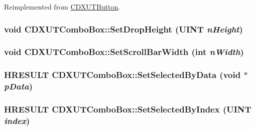 Reimplemented from \hyperlink{class_c_d_x_u_t_button_a75a837a8eca0777b51d3aac6de6d6144}{CDXUTButton}.\hypertarget{class_c_d_x_u_t_combo_box_a1ace87e91be7ab78d7367e99f1788952}{
\subsubsection[{SetDropHeight}]{\setlength{\rightskip}{0pt plus 5cm}void CDXUTComboBox::SetDropHeight (UINT {\em nHeight})}}
\label{class_c_d_x_u_t_combo_box_a1ace87e91be7ab78d7367e99f1788952}
\hypertarget{class_c_d_x_u_t_combo_box_a88c5c2c892f239357443fc6b3b37c40d}{
\subsubsection[{SetScrollBarWidth}]{\setlength{\rightskip}{0pt plus 5cm}void CDXUTComboBox::SetScrollBarWidth ({\bf int} {\em nWidth})}}
\label{class_c_d_x_u_t_combo_box_a88c5c2c892f239357443fc6b3b37c40d}
\hypertarget{class_c_d_x_u_t_combo_box_a66f4a4f8a88f37f0719942b7eac7fed8}{
\subsubsection[{SetSelectedByData}]{\setlength{\rightskip}{0pt plus 5cm}HRESULT CDXUTComboBox::SetSelectedByData (void $\ast$ {\em pData})}}
\label{class_c_d_x_u_t_combo_box_a66f4a4f8a88f37f0719942b7eac7fed8}
\hypertarget{class_c_d_x_u_t_combo_box_aa4b0062f2e1a3a01c2fcc63a652482ef}{
\subsubsection[{SetSelectedByIndex}]{\setlength{\rightskip}{0pt plus 5cm}HRESULT CDXUTComboBox::SetSelectedByIndex (UINT {\em index})}}
\label{class_c_d_x_u_t_combo_box_aa4b0062f2e1a3a01c2fcc63a652482ef}

